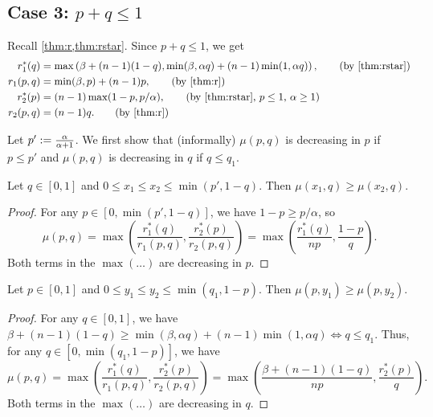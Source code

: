 \subsection{\texorpdfstring{\boldmath}{}Case 3:
    \texorpdfstring{$p + q \le 1$}{p + q <= 1}}
\label{sec:case3}

Recall \cref{thm:r,thm:rstar}.
Since $p + q \le 1$, we get
\begin{align*}
r_1^*(q) &= \max\left(\beta + (n-1)(1-q),
    \min(\beta, \alpha q) + (n-1)\min(1, \alpha q)\right),
    \tag{by \cref{thm:rstar}}
\\ r_1(p, q) &= \min(\beta, p) + (n-1)p,
    \tag{by \cref{thm:r}}
\\ r_2^*(p) &= (n-1)\max(1-p, p/\alpha),
    \tag{by \cref{thm:rstar}, $p \le 1$, $\alpha \ge 1$}
\\ r_2(p, q) &= (n-1)q.
    \tag{by \cref{thm:r}}
\end{align*}

Let $p' := \frac{\alpha}{\alpha+1}$.
We first show that (informally) $\mu(p, q)$ is decreasing in $p$ if $p \le p'$
and $\mu(p, q)$ is decreasing in $q$ if $q \le q_1$.

\begin{lemma}
\label{thm:mu-dec-p}
Let $q \in [0, 1]$ and $0 \le x_1 \le x_2 \le \min(p', 1-q)$.
Then $\mu(x_1, q) \ge \mu(x_2, q)$.
\end{lemma}
\begin{proof}
For any $p \in [0, \min(p', 1-q)]$, we have $1-p \ge p/\alpha$, so
\[ \mu(p, q) = \max\left(\frac{r_1^*(q)}{r_1(p, q)}, \frac{r_2^*(p)}{r_2(p, q)}\right)
    = \max\left(\frac{r_1^*(q)}{np}, \frac{1-p}{q}\right). \]
Both terms in the $\max(\ldots)$ are decreasing in $p$.
\end{proof}

\begin{lemma}
\label{thm:mu-dec-q}
Let $p \in [0, 1]$ and $0 \le y_1 \le y_2 \le \min(q_1, 1-p)$.
Then $\mu(p, y_1) \ge \mu(p, y_2)$.
\end{lemma}
\begin{proof}
For any $q \in [0, 1]$, we have
$\beta + (n-1)(1-q) \ge \min(\beta, \alpha q) + (n-1)\min(1, \alpha q) \iff q \le q_1$.
Thus, for any $q \in [0, \min(q_1, 1-p)]$, we have
\[ \mu(p, q) = \max\left(\frac{r_1^*(q)}{r_1(p, q)}, \frac{r_2^*(p)}{r_2(p, q)}\right)
    = \max\left(\frac{\beta + (n-1)(1-q)}{np}, \frac{r_2^*(p)}{q}\right). \]
Both terms in the $\max(\ldots)$ are decreasing in $q$.
\end{proof}

